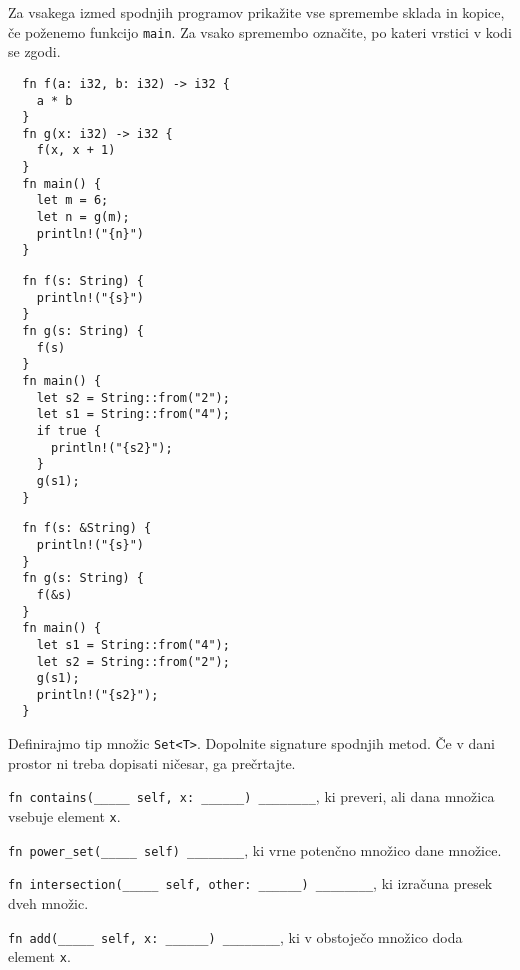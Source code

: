 \documentclass[arhiv]{../izpit}
\begin{document}


\naloga[\tocke{10}]

Za vsakega izmed spodnjih programov prikažite vse spremembe sklada in kopice, če poženemo funkcijo \texttt{main}. Za vsako spremembo označite, po kateri vrstici v kodi se zgodi.

\podnaloga
\begin{verbatim}
  fn f(a: i32, b: i32) -> i32 {
    a * b
  }
  fn g(x: i32) -> i32 {
    f(x, x + 1)
  }
  fn main() {
    let m = 6;
    let n = g(m);
    println!("{n}")
  }
\end{verbatim}

\podnaloga
\begin{verbatim}
  fn f(s: String) {
    println!("{s}")
  }
  fn g(s: String) {
    f(s)
  }
  fn main() {
    let s2 = String::from("2");
    let s1 = String::from("4");
    if true {
      println!("{s2}");
    }
    g(s1);
  }
\end{verbatim}

\podnaloga
\begin{verbatim}
  fn f(s: &String) {
    println!("{s}")
  }
  fn g(s: String) {
    f(&s)
  }
  fn main() {
    let s1 = String::from("4");
    let s2 = String::from("2");
    g(s1);
    println!("{s2}");
  }
\end{verbatim}



\naloga[\tocke{10}]

Definirajmo tip množic \texttt{Set<T>}. Dopolnite signature spodnjih metod. Če v dani prostor ni treba dopisati ničesar, ga prečrtajte.

\podnaloga
  \texttt{fn contains(_____ self, x: ______) ________}, ki preveri, ali dana množica vsebuje element \texttt{x}.

\podnaloga
  \texttt{fn power_set(_____ self) ________}, ki vrne potenčno množico dane množice.

\podnaloga
  \texttt{fn intersection(_____ self, other: ______) ________}, ki izračuna presek dveh množic.

\podnaloga
  \texttt{fn add(_____ self, x: ______) ________}, ki v obstoječo množico doda element \texttt{x}.
\end{document}
